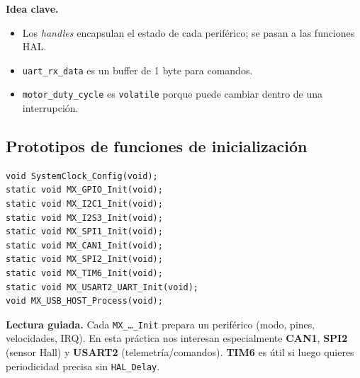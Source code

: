 \documentclass[a4paper,12pt]{article}
\begin{document}
\newpage
\noindent\textbf{Idea clave.}
\begin{itemize}
  \item Los \textit{handles} encapsulan el estado de cada periférico; se pasan a las funciones HAL.
  \item \texttt{uart\_rx\_data} es un buffer de 1 byte para comandos.
  \item \texttt{motor\_duty\_cycle} es \texttt{volatile} porque puede cambiar dentro de una interrupción.
\end{itemize}

\subsection{Prototipos de funciones de inicialización}
\begin{lstlisting}
void SystemClock_Config(void);
static void MX_GPIO_Init(void);
static void MX_I2C1_Init(void);
static void MX_I2S3_Init(void);
static void MX_SPI1_Init(void);
static void MX_CAN1_Init(void);
static void MX_SPI2_Init(void);
static void MX_TIM6_Init(void);
static void MX_USART2_UART_Init(void);
void MX_USB_HOST_Process(void);
\end{lstlisting}

\noindent\textbf{Lectura guiada.} Cada \texttt{MX\_\ldots\_Init} prepara un periférico (modo, pines, velocidades, IRQ). En esta práctica nos interesan especialmente \textbf{CAN1}, \textbf{SPI2} (sensor Hall) y \textbf{USART2} (telemetría/comandos). \textbf{TIM6} es útil si luego quieres periodicidad precisa sin \texttt{HAL\_Delay}.

\newpage
\end{document}
